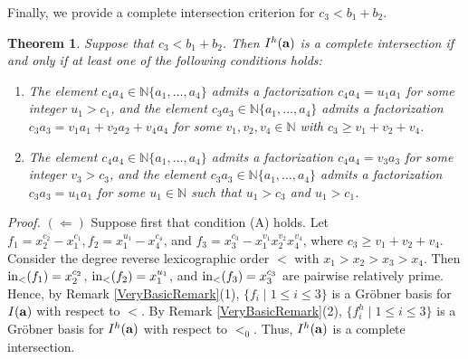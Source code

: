 \documentclass[10pt]{amsart}
\newtheorem{thm1}{Theorem}[section]
\begin{document}
Finally, we provide a complete intersection criterion for $c_3<b_1+b_2$.

\begin{thm1} \label{Basic26} Suppose that $c_3<b_1+b_2$. Then $I^{h}({\bf a})$ is a complete intersection if and only if at least one of the following conditions holds: \begin{enumerate} \item[(A)] The element $c_{4}a_4 \in \mathbb{N}\{a_1,\ldots,a_4\}$ admits a factorization $c_{4}a_4=u_1a_{1}$ for some integer $u_{1}>c_1$, and the element $c_{3}a_3 \in \mathbb{N}\{a_1,\ldots,a_4\}$ admits a factorization $c_{3}a_3=v_1a_{1}+v_2a_{2}+v_4a_4$ for some $v_1, v_2, v_4 \in \mathbb{N}$ with $c_3 \geq v_1+v_2+v_4$.
\item[(B)] The element $c_{4}a_4 \in \mathbb{N}\{a_1,\ldots,a_4\}$ admits a factorization $c_{4}a_4=v_3a_{3}$ for some integer $v_{3}>c_3$, and the element $c_{3}a_3 \in \mathbb{N}\{a_1,\ldots,a_4\}$ admits a factorization $c_{3}a_3=u_1a_{1}$ for some $u_1 \in \mathbb{N}$ such that $u_1>c_3$ and $u_1>c_1$.
\end{enumerate}
\end{thm1}

{\em \noindent Proof.} $(\Leftarrow)$ Suppose first that condition (A) holds. Let $f_{1}=x_{2}^{c_2}-x_{1}^{c_1}, f_{2}=x_{1}^{u_1}-x_{4}^{c_4}$, and $f_{3}=x_{3}^{c_3}-x_{1}^{v_1}x_{2}^{v_2}x_4^{v_4}$, where $c_3 \geq v_1+v_2+v_4$. Consider the degree reverse lexicographic order $<$ with $x_1>x_2>x_3>x_4$. Then ${\rm in}_{<}(f_{1})=x_{2}^{c_2}$, ${\rm in}_{<}(f_{2})=x_{1}^{u_1}$, and ${\rm in}_{<}(f_{3})=x_{3}^{c_3}$ are pairwise relatively prime. Hence, by Remark \ref{VeryBasicRemark}(1), $\{f_{i} \mid 1 \leq i \leq 3\}$ is a Gr\"obner basis for $I({\bf a})$ with respect to $<$. By Remark \ref{VeryBasicRemark}(2), $\{f_{i}^h \mid 1 \leq i \leq 3\}$ is a Gr\"obner basis for $I^{h}({\bf a})$ with respect to $<_{0}$. Thus, $I^{h}({\bf a})$ is a complete intersection. 
\end{document}
